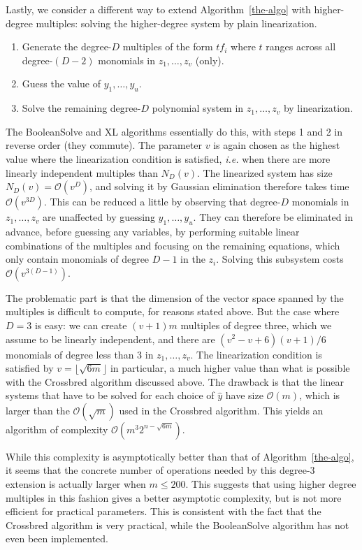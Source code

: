 \documentclass[a4paper,UKenglish,cleveref, autoref]{lipics-v2019}
\newcommand{\bigO}[1]{\ensuremath{\mathcal{O}\left( #1 \right)} }
\begin{document}
Lastly, we consider a different way to extend Algorithm~\ref{the-algo} with
higher-degree multiples: solving the higher-degree system by plain
linearization.

\begin{enumerate}
\item Generate the degree-$D$ multiples of the form $t f_i$ where $t$ ranges
  across all degree-$(D-2)$ monomials in $z_1, \dots, z_v$ (only).
  
\item Guess the value of $y_1, \dots, y_u$.
  
\item Solve the remaining degree-$D$ polynomial system in $z_1, \dots, z_v$ by
  linearization.
\end{enumerate}

The \textsf{BooleanSolve} and \textsf{XL} algorithms essentially do this, with
steps 1 and 2 in reverse order (they commute). The parameter $v$ is again chosen
as the highest value where the linearization condition is satisfied,
\textit{i.e.} when there are more linearly independent multiples than
$N_D(v)$. The linearized system has size $N_D(v) = \bigO{v^D}$, and solving it
by Gaussian elimination therefore takes time $\bigO{v^{3D}}$. This can be
reduced a little by observing that degree-$D$ monomials in $z_1, \dots, z_v$ are
unaffected by guessing $y_1, \dots, y_u$. They can therefore be eliminated in
advance, before guessing any variables, by performing suitable linear
combinations of the multiples and focusing on the remaining equations, which
only contain monomials of degree $D-1$ in the $z_i$. Solving this subsystem
costs $\bigO{v^{3(D-1)}}$.

The problematic part is that the dimension of the vector space spanned by the
multiples is difficult to compute, for reasons stated above. But the case where
$D=3$ is easy: we can create $(v+1)m$ multiples of degree three, which we assume
to be linearly independent, and there are $(v^2 - v + 6)(v + 1)/6$ monomials of
degree less than 3 in $z_1, \dots, z_v$. The linearization condition is
satisfied by $v = \lfloor \sqrt{6m} \rfloor$ in particular, a much higher value
than what is possible with the \textsf{Crossbred} algorithm discussed above. The
drawback is that the linear systems that have to be solved for each choice of
$\hat y$ have size $\bigO{m}$, which is larger than the $\bigO{\sqrt{m}}$ used
in the \textsf{Crossbred} algorithm. This yields an algorithm of complexity
$\bigO{m^3 2^{n - \sqrt{6m}}}$.

While this complexity is asymptotically better than that of
Algorithm~\ref{the-algo}, it seems that the concrete number of operations needed
by this degree-3 extension is actually larger when $m \leq 200$.  This suggests
that using higher degree multiples in this fashion gives a better asymptotic
complexity, but is not more efficient for practical parameters. This is
consistent with the fact that the \textsf{Crossbred} algorithm is very
practical, while the \textsf{BooleanSolve} algorithm has not even been
implemented.


\end{document}
